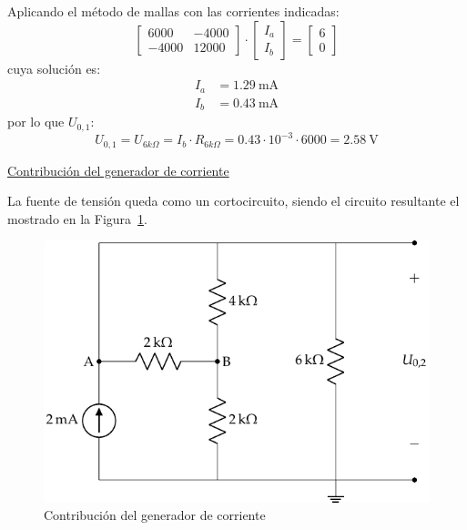 \begin{example}
    Aplicando el método de mallas con las corrientes indicadas:
    \begin{equation*}
        \begin{bmatrix}
            6000 & -4000\\[4pt]
            -4000 & 12000
        \end{bmatrix}
        \cdot
        \begin{bmatrix}
            I_a\\[4pt]
            I_b
        \end{bmatrix}
        =
        \begin{bmatrix}
            6\\[4pt]
            0
        \end{bmatrix}
    \end{equation*}
    cuya solución es:
    \begin{align*}
        I_a &= \qty{1.29}{\milli\ampere}\\
        I_b &= \qty{0.43}{\milli\ampere}
    \end{align*}
    por lo que $U_{0,1}$:
    \begin{equation*}
        U_{0,1} 
        = U_{6k\Omega}
        = I_b\cdot R_{6k\Omega}
        = 0.43\cdot 10^{-3}\cdot 6000
        = \qty{2.58}{\volt}
    \end{equation*}

    \vspace{2mm}
    \underline{Contribución del generador de corriente}

    \vspace{2mm}
    La fuente de tensión queda como un cortocircuito, siendo el circuito resultante el mostrado en la Figura~\ref{fig.ej_superposicion_cc_corriente}. 
    \begin{figure}[H]
        \centering
        \includegraphics[width=0.6\linewidth]{../figs/ej_superposicion_cc_corriente.pdf}
        \caption{Contribución del generador de corriente}
        \label{fig.ej_superposicion_cc_corriente}
    \end{figure}
    

\end{example}
